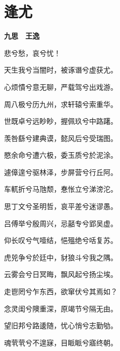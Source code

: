 \documentclass[12pt,a4paper]{ctexbook}
\begin{document}
\section{逢尤}
\textbf{九思　王逸}\par\vspace{0.5em}
悲兮愁，哀兮忧！\par
天生我兮当闇时，被诼谮兮虚获尤。\par
心烦憒兮意无聊，严载驾兮出戏游。\par
周八极兮历九州，求轩辕兮索重华。\par
世既卓兮远眇眇，握佩玖兮中路躇。\par
羡咎繇兮建典谟，懿风后兮受瑞图。\par
愍余命兮遭六极，委玉质兮於泥涂。\par
遽傽遑兮驱林泽，步屏营兮行丘阿。\par
车軏折兮马虺颓，惷怅立兮涕滂沱。\par
思丁文兮圣明哲，哀平差兮迷谬愚。\par
吕傅举兮殷周兴，忌嚭专兮郢吴虚。\par
仰长叹兮气噎结，悒殟绝兮咶复苏。\par
虎兕争兮於廷中，豺狼斗兮我之隅。\par
云雾会兮日冥晦，飘风起兮扬尘埃。\par
走鬯罔兮乍东西，欲窜伏兮其焉如？\par
念灵闺兮隩重深，原竭节兮隔无由。\par
望旧邦兮路逶随，忧心悄兮志勤劬。\par
魂茕茕兮不遑寐，目眽眽兮寤终朝。\par
\end{document}
